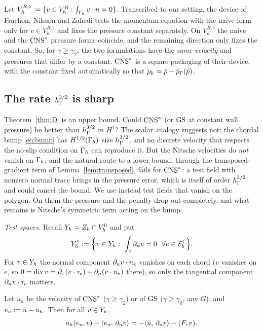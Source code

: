 \begin{remark}\label{rem:fnz}
Let $V_h^{R,\flat}:=\{v\in V_h^R:\int_{\Gamma_h}v\cdot n=0\}$. Transcribed to our setting, the device of Frachon, Nilsson and Zahedi \cite[Section~5.1]{FrachonNilssonZahedi2024} tests the momentum equation with the naive form only for $v\in V_h^{R,\flat}$ and fixes the pressure constant separately. On $V_h^{R,\flat}$ the naive and the $\mathrm{CNS}^\ast$ pressure forms coincide, and the remaining direction only fixes the constant. So, for $\gamma\ge\gamma_2$, the two formulations have the \emph{same velocity} and pressures that differ by a constant. $\mathrm{CNS}^\ast$ is a square packaging of their device, with the constant fixed automatically so that $p_h\approx\tilde p-\bar p_{\Gamma}(\tilde p)$.
\end{remark}

\subsection{The rate \texorpdfstring{$h_\Gamma^{3/2}$}{h^(3/2)} is sharp}\label{sec:lb}
Theorem~\ref{thm:D} is an upper bound. Could $\mathrm{CNS}^\ast$ (or $\mathrm{GS}$ at constant wall pressure) be better than $h_\Gamma^{3/2}$ in $H^1$? The scalar analogy suggests not: the chordal bump \eqref{eq:bump} has $H^{1/2}(\Gamma_h)$ size $h_\Gamma^{3/2}$, and no discrete velocity that respects the no-slip condition on $\Gamma_h$ can reproduce it. But the Nitsche velocities do \emph{not} vanish on $\Gamma_h$, and the natural route to a lower bound, through the transposed-gradient term of Lemma~\ref{lem:transposed}, fails for $\mathrm{CNS}^\ast$: a test field with nonzero normal trace brings in the pressure error, which is itself of order $h_\Gamma^{3/2}$ and could cancel the bound. We use instead test fields that vanish on the polygon. On them the pressure and the penalty drop out completely, and what remains is Nitsche's symmetric term acting on the bump.

\emph{Test spaces.} Recall $Y_h=Z_h\cap V_h^0$ and put
\[
Y_h^1:=\Bigl\{v\in Y_h:\ \int_e\partial_n v=0\ \ \forall e\in\mathcal E_h^\Gamma\Bigr\}.
\]
For $v\in Y_h$ the normal component $\partial_n v\cdot n_e$ vanishes on each chord ($v$ vanishes on $e$, so $0=\operatorname{div} v=\partial_\tau(v\cdot\tau_e)+\partial_n(v\cdot n_e)$ there), so only the tangential component $\partial_n v\cdot\tau_e$ matters.

\begin{lemma}\label{lem:lbid}
Let $u_h$ be the velocity of $\mathrm{CNS}^\ast$ ($\gamma\ge\gamma_2$) or of $\mathrm{GS}$ ($\gamma\ge\gamma_0$, any $G$), and $e_u:=\tilde u-u_h$. Then for all $v\in Y_h$,
\[
a_h(e_u,v)-\langle e_u,\, \partial_n v\rangle=-\langle \tilde u,\, \partial_n v\rangle-(F,v).
\]
\end{lemma}

